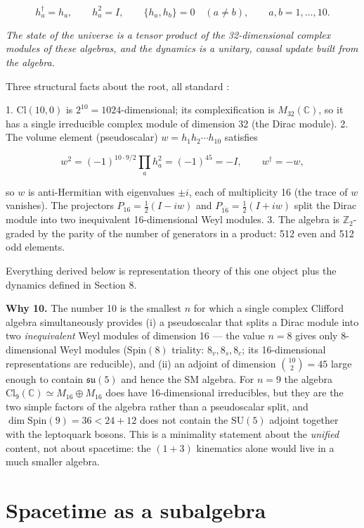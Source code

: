 \documentclass[aps,prd,amsmath,amssymb,superscriptaddress,longbibliography,floatfix,preprint]{revtex4-2}
\begin{document}
\[h_a^\dagger = h_a,\qquad h_a^2 = I,\qquad \{h_a,h_b\} = 0 \quad (a\ne b),\qquad a,b = 1,\dots,10.\]

\emph{The state of the universe is a tensor product of the 32-dimensional complex modules of these algebras, and the dynamics is a unitary, causal update built from the algebra.}

Three structural facts about the root, all standard \cite{ref10,ref18}:

1. $\mathrm{Cl}(10,\allowbreak{}0)$ is $2^{10} = 1024$-dimensional; its complexification is $M_{32}(\mathbb{C})$, so it has a single irreducible complex module of dimension 32 (the Dirac module). 2. The volume element (pseudoscalar) $w = h_1 h_2 \cdots h_{10}$ satisfies

\[w^2 = (-1)^{10\cdot 9/2}\prod_a h_a^2 = (-1)^{45} = -I,\qquad w^\dagger = -w,\]

so $w$ is anti-Hermitian with eigenvalues $\pm i$, each of multiplicity 16 (the trace of $w$ vanishes). The projectors $P_{16} = \tfrac12(I - i w)$ and $P_{\overline{16}} = \tfrac12(I + i w)$ split the Dirac module into two inequivalent 16-dimensional Weyl modules. 3. The algebra is $\mathbb{Z}_2$-graded by the parity of the number of generators in a product: 512 even and 512 odd elements.

Everything derived below is representation theory of this one object plus the dynamics defined in Section 8.

\textbf{Why 10.} The number 10 is the smallest $n$ for which a single complex Clifford algebra simultaneously provides (i) a pseudoscalar that splits a Dirac module into two \emph{inequivalent} Weyl modules of dimension 16 --- the value $n = 8$ gives only 8-dimensional Weyl modules ($\mathrm{Spin}(8)$ triality: $8_v,\allowbreak{} 8_s,\allowbreak{} 8_c$; its 16-dimensional representations are reducible), and (ii) an adjoint of dimension $\binom{10}{2} = 45$ large enough to contain $\mathfrak{su}(5)$ and hence the SM algebra. For $n = 9$ the algebra $\mathrm{Cl}_9(\mathbb{C}) \simeq M_{16}\oplus M_{16}$ does have 16-dimensional irreducibles, but they are the two simple factors of the algebra rather than a pseudoscalar split, and $\dim\mathrm{Spin}(9) = 36 < 24 + 12$ does not contain the $\mathrm{SU}(5)$ adjoint together with the leptoquark bosons. This is a minimality statement about the \emph{unified} content, not about spacetime: the $(1{+}3)$ kinematics alone would live in a much smaller algebra.

\section{Spacetime as a subalgebra}
\end{document}
